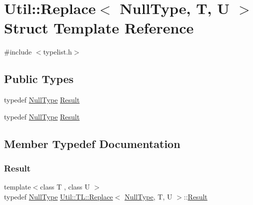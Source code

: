 \hypertarget{structUtil_1_1TL_1_1Replace_3_01NullType_00_01T_00_01U_01_4}{}\section{Util\+:\+:Replace$<$ Null\+Type, T, U $>$ Struct Template Reference}
\label{structUtil_1_1TL_1_1Replace_3_01NullType_00_01T_00_01U_01_4}


{\ttfamily \#include $<$typelist.\+h$>$}

\subsection*{Public Types}
\begin{DoxyCompactItemize}
\item 
typedef \mbox{\hyperlink{classUtil_1_1NullType}{Null\+Type}} \mbox{\hyperlink{structUtil_1_1TL_1_1Replace_3_01NullType_00_01T_00_01U_01_4_a28b43cf01f62dc72284927d673a7d228}{Result}}
\item 
typedef \mbox{\hyperlink{classUtil_1_1NullType}{Null\+Type}} \mbox{\hyperlink{structUtil_1_1TL_1_1Replace_3_01NullType_00_01T_00_01U_01_4_a28b43cf01f62dc72284927d673a7d228}{Result}}
\end{DoxyCompactItemize}


\subsection{Member Typedef Documentation}
\mbox{\label{structUtil_1_1TL_1_1Replace_3_01NullType_00_01T_00_01U_01_4_a28b43cf01f62dc72284927d673a7d228}} 
\subsubsection{\texorpdfstring{Result}{Result}\hspace{0.1cm}{\footnotesize\ttfamily [1/2]}}
{\footnotesize\ttfamily template$<$class T , class U $>$ \\
typedef \mbox{\hyperlink{classUtil_1_1NullType}{Null\+Type}} \mbox{\hyperlink{structUtil_1_1TL_1_1Replace}{Util\+::\+T\+L\+::\+Replace}}$<$ \mbox{\hyperlink{classUtil_1_1NullType}{Null\+Type}}, T, U $>$\+::\mbox{\hyperlink{structUtil_1_1TL_1_1Replace_3_01NullType_00_01T_00_01U_01_4_a28b43cf01f62dc72284927d673a7d228}{Result}}}

